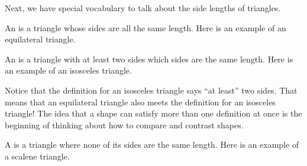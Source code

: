 \documentclass{ximera}
\begin{document}
Next, we have special vocabulary to talk about the side lengths of triangles.

\begin{definition}
	An  is a triangle whose sides are all the same length. Here is an example of an equilateral triangle.
	\begin{center}
	\end{center}
\end{definition}


\begin{definition}
	An  is a triangle with at least two sides which sides are the same length. Here is an example of an isosceles triangle.
	\begin{center}
	\end{center}
\end{definition}
Notice that the definition for an isosceles triangle says ``at least'' two sides. That means that an equilateral triangle also meets the definition for an isosceles triangle! The idea that a shape can satisfy more than one definition at once is the beginning of thinking about how to compare and contrast shapes.

\begin{definition}
	A  is a triangle where none of its sides are the same length. Here is an example of a scalene triangle.
	\begin{center}
	\end{center}
\end{definition}
\end{document}
